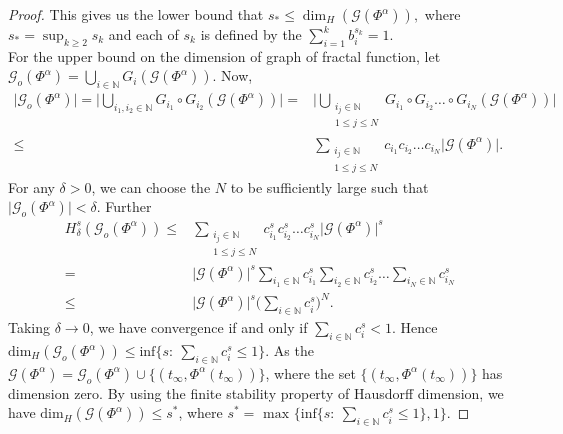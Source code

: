 \documentclass[12pt,oneside,reqno]{amsart}
\theoremstyle{definition}
\theoremstyle{remark}
\begin{document}
\begin{proof}
 This gives us the lower bound that $s_* \leq \dim_H(\mathcal{G}(\Phi^\alpha)),$ where $s_*=\sup_{k\geq 2}s_k$ and each of $s_k$ is defined by the $\sum_{i=1}^{k}b_i^{s_k} =1$.\\
For the upper bound on the dimension of graph of fractal function, let $\mathcal{G}_o(\Phi^\alpha )=\underset{i\in \mathbb{N}}{\bigcup}G_i(\mathcal{G}(\Phi^\alpha)).$ Now,
\begin{equation*}
    \begin{aligned}
     \lvert\mathcal{G}_o(\Phi^\alpha)\rvert= \bigg\lvert\underset{i_1,i_2\in \mathbb{N}}{\bigcup}G_{i_1}\circ G_{i_2}(\mathcal{G}(\Phi^\alpha))\bigg\rvert=&\bigg\lvert\bigcup\limits_{\substack{i_j\in \mathbb{N} \\ 1\leq j\le N}}G_{i_1}\circ G_{i_2}\dots \circ G_{i_N}(\mathcal{G}(\Phi^\alpha))\bigg\rvert \\ \leq & \sum_{\substack{i_j\in \mathbb{N} \\ 1\leq j\le N}}c_{i_1}c_{i_2} \dots c_{i_N}\lvert\mathcal{G}(\Phi^\alpha)\rvert.
    \end{aligned}
\end{equation*}
 For any $\delta > 0$, we can choose the $N$ to be sufficiently large such that $\lvert\mathcal{G}_o(\Phi^\alpha)\rvert < \delta$. Further
 \begin{equation*}
     \begin{aligned}
         H_\delta^s(\mathcal{G}_o(\Phi^\alpha)) \le &\sum_{\substack{i_j\in \mathbb{N} \\ 1\leq j\le N}}c_{i_1}^sc_{i_2}^s \dots c_{i_N}^s\lvert\mathcal{G}(\Phi^\alpha)\rvert^s  \\ =& \lvert\mathcal{G}(\Phi^\alpha)\rvert^s \sum_{i_1\in \mathbb{N}}c_{i_1}^s\sum_{i_2\in \mathbb{N}}c_{i_2}^s\dots\sum_{i_N\in \mathbb{N}}c_{i_N}^s \\  \le & \lvert\mathcal{G}(\Phi^\alpha)\rvert^s\bigg(\sum_{i\in \mathbb{N}}c_{i}^s\bigg)^N .
     \end{aligned}
 \end{equation*}
 Taking $\delta \rightarrow 0$, we have convergence if and only if $\sum_{i\in \mathbb{N}}c_{i}^s < 1$. Hence $\text{dim}_H(\mathcal{G}_o(\Phi^\alpha))\le \text{inf}\bigg\{s: ~ \sum_{i\in \mathbb{N}}c_{i}^s \le 1 \bigg\}.$ As the $\mathcal{G}(\Phi^\alpha)=\mathcal{G}_o(\Phi^\alpha)\cup \{(t_\infty,\Phi^\alpha(t_\infty))\}$, where the set $ \{(t_\infty,\Phi^\alpha(t_\infty))\}$ has dimension zero. By using the finite stability property of Hausdorff dimension, we have $\text{dim}_H(\mathcal{G}(\Phi^\alpha))\le s^*$, where   $s^*=\text{ max }\bigg\{\text{inf}\big\{s: ~ \sum_{i\in \mathbb{N}}c_{i}^s \le 1 \big\},1\bigg\}.$
 \end{proof}
\end{document}
